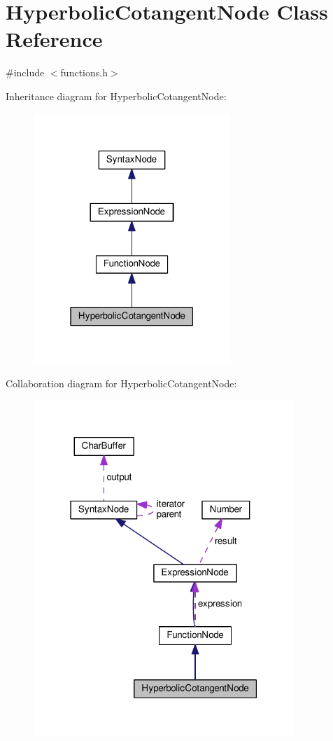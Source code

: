 \hypertarget{classHyperbolicCotangentNode}{}\section{Hyperbolic\+Cotangent\+Node Class Reference}
\label{classHyperbolicCotangentNode}


{\ttfamily \#include $<$functions.\+h$>$}



Inheritance diagram for Hyperbolic\+Cotangent\+Node\+:
\nopagebreak
\begin{figure}[H]
\begin{center}
\leavevmode
\includegraphics[width=211pt]{df/da3/classHyperbolicCotangentNode__inherit__graph}
\end{center}
\end{figure}


Collaboration diagram for Hyperbolic\+Cotangent\+Node\+:
\nopagebreak
\begin{figure}[H]
\begin{center}
\leavevmode
\includegraphics[width=279pt]{de/d7f/classHyperbolicCotangentNode__coll__graph}
\end{center}
\end{figure}
